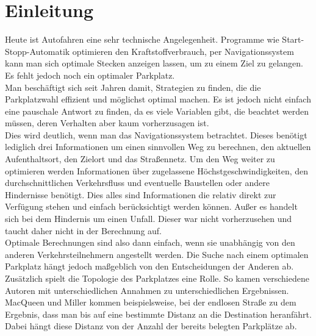 \section{Einleitung}

Heute ist Autofahren eine sehr technische Angelegenheit. Programme wie Start-Stopp-Automatik optimieren den Kraftstoffverbrauch, per Navigationssystem kann man sich optimale Stecken anzeigen lassen, um zu einem Ziel zu gelangen.\\
Es fehlt jedoch noch ein optimaler Parkplatz.\\
Man beschäftigt sich seit Jahren damit, Strategien zu finden, die die Parkplatzwahl effizient und möglichst optimal machen. Es ist jedoch nicht einfach eine pauschale Antwort zu finden, da es viele Variablen gibt, die beachtet werden müssen, deren Verhalten aber kaum vorherzusagen ist.\\
Dies wird deutlich, wenn man das Navigationssystem betrachtet. Dieses benötigt lediglich drei Informationen um einen sinnvollen Weg zu berechnen, den aktuellen Aufenthaltsort, den Zielort und das Straßennetz. Um den Weg weiter zu optimieren werden Informationen über zugelassene Höchstgeschwindigkeiten, den durchschnittlichen Verkehrsfluss und eventuelle Baustellen oder andere Hindernisse benötigt. Dies alles sind Informationen die relativ direkt zur Verfügung stehen und einfach berücksichtigt werden können. Außer es handelt sich bei dem Hindernis um einen Unfall. Dieser war nicht vorherzusehen und taucht daher nicht in der Berechnung auf.\\
 Optimale Berechnungen sind also dann einfach, wenn sie unabhängig von den anderen Verkehrsteilnehmern angestellt werden. Die Suche nach einem optimalen Parkplatz hängt jedoch maßgeblich von den Entscheidungen der Anderen ab. \\
Zusätzlich spielt die Topologie des Parkplatzes eine Rolle. So kamen verschiedene Autoren mit unterschiedlichen Annahmen zu unterschiedlichen Ergebnissen. MacQueen und Miller kommen beispielsweise, bei der endlosen Straße zu dem Ergebnis, dass man bis auf eine bestimmte Distanz an die Destination heranfährt. Dabei hängt diese Distanz von der Anzahl der bereits belegten Parkplätze ab.\\

